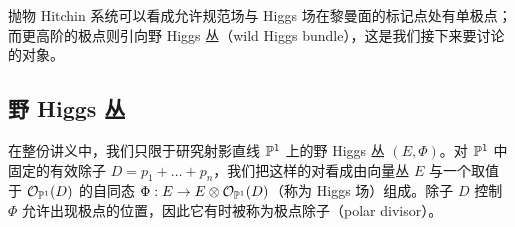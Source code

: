 抛物 Hitchin 系统可以看成允许规范场与 Higgs 场在黎曼面的标记点处有单极点；而更高阶的极点则引向野 Higgs 丛（wild Higgs bundle），这是我们接下来要讨论的对象。

\subsection{野 Higgs 丛}

在整份讲义中，我们只限于研究射影直线 $\mathbb{P}^{1}$ 上的野 Higgs 丛 $(E,\Phi)$。对 $\mathbb{P}^{1}$ 中固定的有效除子 $D=p_1+\dots+p_n$，我们把这样的对看成由向量丛 $E$ 与一个取值于 $\mathcal{O}_{\mathbb{P}^{1}}(D)$ 的自同态 $\Phi: E\to E\otimes\mathcal{O}_{\mathbb{P}^{1}}(D)$（称为 Higgs 场）组成。除子 $D$ 控制 $\Phi$ 允许出现极点的位置，因此它有时被称为极点除子（polar divisor）。
